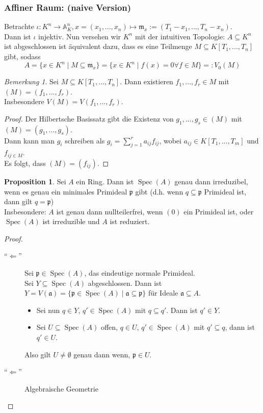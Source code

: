 \documentclass[10pt,a4paper]{article}
\newcommand{\AF}{\ensuremath{\mathbb{A}}}
\newcommand{\Spec}{\ensuremath{\operatorname{Spec}}}
\newcounter{thm}[section]
\let\oldsubsubsection\subsubsection
\renewcommand{\subsubsection}{\stepcounter{thm}\oldsubsubsection}
\theoremstyle{definition}
\newtheorem{prop}[thm]{Proposition}
\theoremstyle{plain}
\theoremstyle{remark}
\newtheorem{bem}[thm]{Bemerkung}
\begin{document}
\subsubsection{Affiner Raum: (naive Version)}
	Betrachte $\iota:K^n\to\AF_K^n,x=(x_1,...,x_n)\mapsto\mathfrak m_x:=(T_1-x_1,...,T_n-x_n)$.\\
	Dann ist $\iota$ injektiv. Nun versehen wir $K^n$ mit der intuitiven Topologie:
	$A\subseteq K^n$ ist abgeschlossen ist äquivalent dazu, dass es eine Teilmenge $M\subseteq K[T_1,...,T_n]$ gibt, sodass
	\[A=\{x\in K^n\mid M\subseteq\mathfrak m_x\}=\{x\in K^n\mid f(x)=0\forall f\in M\}=:V_0(M)\]

\begin{bem}
	Sei $M\subseteq K[T_1,...,T_n]$. Dann existieren $f_1,...,f_r\in M$ mit $(M)=(f_1,...,f_r)$.\\
	Insbesondere $V(M)=V(f_1,...,f_r)$.
\end{bem}
\begin{proof}
	Der Hilbertsche Basissatz gibt die Existenz von $g_1,...,g_s\in(M)$ mit $(M)=(g_1,...,g_s)$.\\
	Dann kann man $g_i$ schreiben als $g_i=\sum_{j=1}^{r}a_{ij}f_{ij}$, wobei $a_{ij}\in K[T_1,...,T_m]$ und $f_{ij\in M}$.\\
	Es folgt, dass $(M)=(f_{ij})$.
\end{proof}

\setcounter{thm}{9}

\begin{prop}\label{1210prop}
	Sei $A$ ein Ring. Dann ist $\Spec(A)$ genau dann irreduzibel, wenn es genau ein minimales Primideal $\mathfrak p$ gibt (d.h. wenn $q\subseteq\mathfrak p$ Primideal ist, dann gilt $q=\mathfrak p$)\\
	Insbesondere: $A$ ist genau dann nullteilerfrei, wenn $(0)$ ein Primideal ist, oder $\Spec(A)$ ist irreduzible und $A$ ist reduziert.
\end{prop}
\begin{proof}
	\begin{description}
		\item[``$\Leftarrow$''] Sei $\mathfrak p\in\Spec(A)$, das eindeutige normale Primideal.\\
		Sei $Y\subseteq\Spec(A)$ abgeschlossen. Dann ist $Y=V(\mathfrak a)=\{\mathfrak p\in \Spec(A)\mid\mathfrak a\subseteq\mathfrak p\}$ für Ideale $\mathfrak a\subseteq A$.
		\begin{itemize}
			\item Sei nun $q\in Y$, $q'\in \Spec(A)$ mit $q\subseteq q'$. Dann ist $q'\in Y$.
			\item Sei $U\subseteq\Spec(A)$ offen, $q\in U$, $q'\in\Spec(A)$ mit $q'\subseteq q$, dann ist $q'\in U$. 
		\end{itemize}
		Also gilt $U\neq\emptyset$ genau dann wenn, $\mathfrak p\in U$.
		\item[``$\Leftarrow$''] Algebraische Geometrie
	\end{description}
\end{proof}
\end{document}
